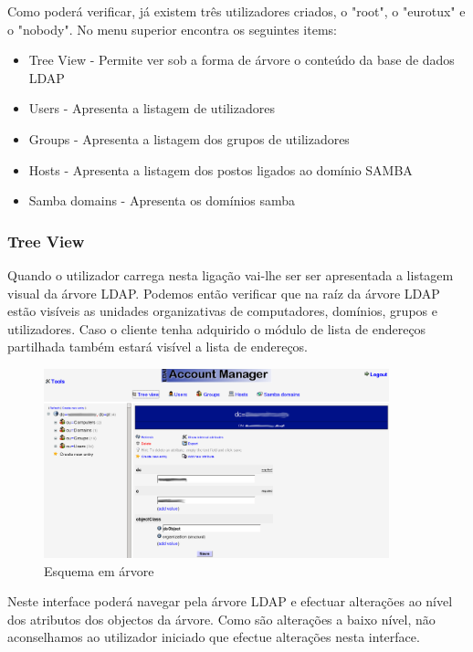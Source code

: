 Como poderá verificar, já existem três utilizadores criados, o "root", o "eurotux" e o "nobody". No menu superior encontra os seguintes items:

\begin{itemize}
\item Tree View - Permite ver sob a forma de árvore o conteúdo da base de dados LDAP
\item Users - Apresenta a listagem de utilizadores
\item Groups - Apresenta a listagem dos grupos de utilizadores
\item Hosts - Apresenta a listagem dos postos ligados ao domínio SAMBA
\item Samba domains - Apresenta os domínios samba
\end{itemize}

\subsubsection{Tree View}
Quando o utilizador carrega nesta ligação vai-lhe ser ser apresentada a listagem visual da árvore LDAP. Podemos então verificar que na raíz da árvore LDAP estão visíveis as unidades organizativas de computadores, domínios, grupos e utilizadores. Caso o cliente tenha adquirido o módulo de lista de endereços partilhada também estará visível a lista de endereços.

\begin{figure}[H]
    \begin{center}
        \includegraphics[width=10cm]{include/img/lam3}
    \end{center}
    \caption{Esquema em árvore}
    \label{fig:LAM3}
\end{figure}

Neste interface poderá navegar pela árvore LDAP e efectuar alterações ao nível dos atributos dos objectos da árvore. Como são alterações a baixo nível, não aconselhamos ao utilizador iniciado que efectue alterações nesta interface.

